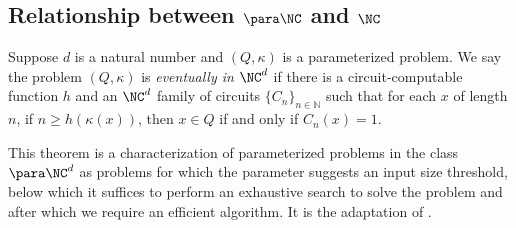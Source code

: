 \documentclass{article}
\begin{document}
\subsection{Relationship between \texorpdfstring{$\para \NC$}{paraNC} and \texorpdfstring{$\NC$}{NC}}

\begin{definition}\label{def:eventually}
  Suppose $d$ is a natural number and $(Q, \kappa)$ is a parameterized problem.
  We say the problem $(Q, \kappa)$ is \emph{eventually in $\NC^d$} if there is a circuit-computable function $h$ and an $\NC^d$ family of circuits $\{C_n\}_{n \in \mathbb{N}}$ such that for each $x$ of length $n$, if $n \geq h(\kappa(x))$, then $x \in Q$ if and only if $C_n(x) = 1$.
\end{definition}

This theorem is a characterization of parameterized problems in the class $\para \NC^d$ as problems for which the parameter suggests an input size threshold, below which it suffices to perform an exhaustive search to solve the problem and after which we require an efficient algorithm.
It is the adaptation of \autocite[Theorem~1.37]{fg06}.
\end{document}
